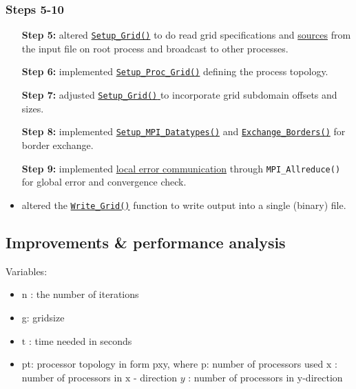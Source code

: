 \subsubsection{Steps 5-10}
\begin{itemize}
    \item [\textbf{Step 5:}] altered 
    \href{https://github.com/PhilipSoliman/hpc-labs/blob/b16da8d7ee717657e13c316369fa0996da7816cc/assignment_1/ppoisson2.c#L196-L215}{\lstinline|Setup_Grid()|} 
    to do read grid specifications and
    \href{https://github.com/PhilipSoliman/hpc-labs/blob/b16da8d7ee717657e13c316369fa0996da7816cc/assignment_1/ppoisson2.c#L255-L281}{sources}
    from the input file on root process and broadcast to other processes.
    \item [\textbf{Step 6:}] implemented 
    \href{https://github.com/PhilipSoliman/hpc-labs/blob/b16da8d7ee717657e13c316369fa0996da7816cc/assignment_1/ppoisson2.c#L289}{\lstinline|Setup_Proc_Grid()|}
    defining the process topology.
    \item [\textbf{Step 7:}] adjusted 
    \href{https://github.com/PhilipSoliman/hpc-labs/blob/b16da8d7ee717657e13c316369fa0996da7816cc/assignment_1/ppoisson2.c#L218-L229}{\lstinline|Setup_Grid()| }
    to incorporate grid subdomain offsets and sizes.
    \item [\textbf{Step 8:}] implemented 
    \href{https://github.com/PhilipSoliman/hpc-labs/blob/b16da8d7ee717657e13c316369fa0996da7816cc/assignment_1/ppoisson2.c#L1063}{\lstinline|Setup_MPI_Datatypes()|}
    and 
    \href{https://github.com/PhilipSoliman/hpc-labs/blob/b16da8d7ee717657e13c316369fa0996da7816cc/assignment_1/ppoisson2.c#L1137-L1144}{\lstinline|Exchange_Borders()|}
    for border exchange.
    \item [\textbf{Step 9:}] implemented 
    \href{https://github.com/PhilipSoliman/hpc-labs/blob/b16da8d7ee717657e13c316369fa0996da7816cc/assignment_1/ppoisson2.c#L637}{local error communication} 
    through \lstinline{MPI_Allreduce()} for global error and convergence check.
    \item [\textbf{Step 10:}] altered the
    \href{https://github.com/PhilipSoliman/hpc-labs/blob/b16da8d7ee717657e13c316369fa0996da7816cc/assignment_1/ppoisson2.c#L665}{\lstinline|Write_Grid()|}
    function to write output into a single (binary) file.
\end{itemize}

\subsection{Improvements \& performance analysis}
Variables:
\begin{itemize}
    \item $\mathrm{n}$ : the number of iterations
    \item g: gridsize
    \item $\mathrm{t}$ : time needed in seconds
    \item pt: processor topology in form pxy, where p: number of processors used $\mathrm{x}$ : number of processors in $\mathrm{x}$ - direction $y$ : number of processors in y-direction
\end{itemize}


